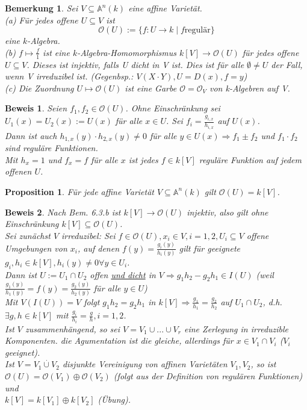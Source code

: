 \documentclass[a4paper,12pt]{report}
\theoremstyle{break}
\newtheorem{Bem}[Def]{Bemerkung}
\newtheorem{Prop}[Def]{Proposition}
\theoremstyle{nonumberbreak}
\newtheorem{Bew}{Beweis}
\theoremstyle{nonumberplain}
\begin{document}
\begin{Bem}
Sei $V\subseteq \mathbb{A}^n(k)$ eine affine Varietät.\\
(a) Für jedes offene $U\subseteq V$ ist
$$\mathcal{O}(U):= \{f: U \rightarrow k \mid f \textrm{regulär}\}$$
eine $k$-Algebra.\\
(b) $f\mapsto \frac{f}{1}$ ist eine $k$-Algebra-Homomorphismus $k[V]\rightarrow \mathcal{O}(U)$ für jedes offene $U\subseteq V$. Dieses ist injektiv, falls U dicht in V ist. Dies ist für alle $\emptyset\neq U$ der Fall, wenn V irreduzibel ist. (Gegenbsp.: $V(X\cdot Y), U=D(x), f=y$)\\
(c) Die Zuordnung $U\mapsto \mathcal{O}(U)$ ist eine Garbe $\mathcal{O}=\mathcal{O}_V$ von k-Algebren auf V.
\end{Bem}
\begin{Bew}
Seien $f_1,f_2\in\mathcal{O}(U)$. Ohne Einschränkung sei $U_1(x)=U_2(x):=U(x)$ für alle $x\in U$.
Sei $f_i=\frac{g_{i,x}}{h_{i,x}}$ auf $U(x)$.\\
Dann ist auch $h_{1,x}(y)\cdot h_{2,x}(y)\neq 0$ für alle $y\in U(x) \Rightarrow f_1\pm f_2$ und $f_1\cdot f_2$ sind reguläre Funktionen.\\
Mit $h_x=1$ und $f_x=f$ für alle $x$ ist jedes $f\in k[V]$ reguläre Funktion auf jedem offenen $U$.
\end{Bew}
\begin{Prop}
Für jede affine Varietät $V\subseteq\mathbb{A}^n(k)$ gilt $\mathcal{O}(U)=k[V]$.
\end{Prop}
\begin{Bew} Nach Bem. 6.3.b ist $k[V] \rightarrow \mathcal{O}(U)$ injektiv, also gilt ohne Einschränkung $k[V]\subseteq \mathcal{O}(U)$.\\
Sei zunächst $V$ irreduzibel: Sei $f\in \mathcal{O}(U), x_i\in V, i=1,2, U_i\subseteq V$ offene Umgebungen von $x_i$, auf denen $f(y)=\frac{g_i(y)}{h_i(y)}$ gilt für geeignete $g_i,h_i\in k[V], h_i(y)\neq 0 \forall y\in U_i$.\\
Dann ist $U:=U_1\cap U_2$ offen \underline{und dicht} in $V \Rightarrow g_1h_2-g_2h_1\in I(U)$ (weil $\frac{g_1(y)}{h_1(y)}=f(y)=\frac{g_2(y)}{h_2(y)}$ für alle $y\in U$)\\
Mit $V(I(U))=V$ folgt $g_1h_2=g_2h_1$ in $k[V]\Rightarrow \frac{g_1}{h_1}=\frac{g_2}{h_2}$ auf $U_1\cap U_2$, d.h. $\exists g,h\in k[V]$ mit $\frac{g_i}{h_i}=\frac{g}{h}, i=1,2$.\\
Ist $V$ zusammenhängend, so sei $V=V_1\cup ... \cup V_r$ eine Zerlegung in irreduzible Komponenten. die Agumentation ist die gleiche, allerdings für $x\in V_1\cap V_i$ ($V_i$ geeignet).\\
Ist  $V=V_1\stackrel{\cdot}{\cup} V_2$ disjunkte Vereinigung von affinen Varietäten $V_1,V_2$, so ist\\
$\mathcal{O}(U)=\mathcal{O}(V_1)\oplus\mathcal{O}(V_2)$ (folgt aus der Definition von regulären Funktionen) und\\
$k[V]=k[V_1]\oplus k[V_2]$ (Übung).
\end{Bew}
\end{document}
